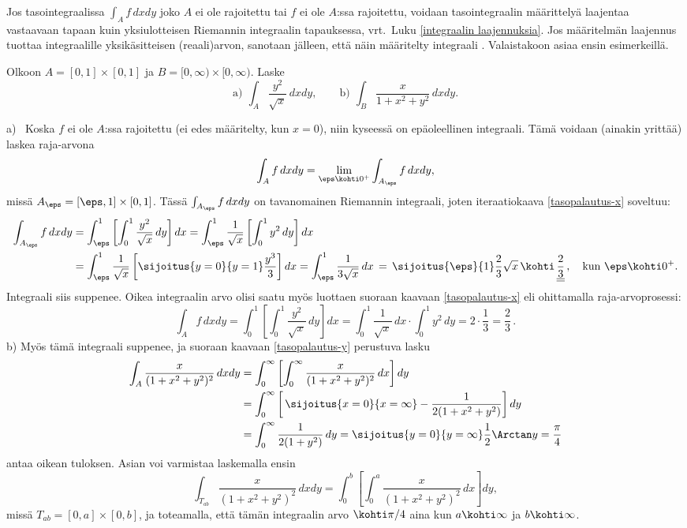 Jos tasointegraalissa $\int_A f\,dxdy$ joko $A$ ei ole rajoitettu tai $f$ ei ole $A$:ssa
rajoitettu, voidaan tasointegraalin määrittelyä laajentaa vastaavaan tapaan kuin yksiulotteisen
Riemannin integraalin tapauksessa, vrt.\ Luku \ref{integraalin laajennuksia}. Jos määritelmän
laajennus tuottaa integraalille yksikäsitteisen (reaali)arvon, sanotaan jälleen, että näin
%
määritelty  integraali . Valaistakoon asiaa ensin esimerkeillä.
\begin{Exa} Olkoon $A=[0,1]\times[0,1]$ ja $B=[0,\infty)\times[0,\infty)$. Laske
\[
\text{a)}\,\ \int_A \frac{y^2}{\sqrt{x}}\,dxdy, \qquad
\text{b)}\,\ \int_B \frac{x}{1+x^2+y^2}\,dxdy.
\]
\end{Exa}
\ratk a) \ Koska $f$ ei ole $A$:ssa rajoitettu (ei edes määritelty, kun $x=0$), niin kyseessä
on epäoleellinen integraali. Tämä voidaan (ainakin yrittää) laskea raja-arvona
\[
\int_A f\,dxdy=\lim_{\eps\kohti 0^+} \int_{A_\eps} f\,dxdy,
\]
missä $A_\eps=[\eps,1]\times [0,1]$. Tässä $\int_{A_\eps} f\,dxdy$ on tavanomainen Riemannin
integraali, joten iteraatiokaava \eqref{tasopalautus-x} soveltuu:
\begin{align*}
\int_{A_\eps} f\,dxdy 
&= \int_\eps^1 \left[ \int_0^1 \frac{y^2}{\sqrt{x}}\,dy \right]dx
 = \int_\eps^1 \frac{1}{\sqrt{x}}\left[ \int_0^1 y^2\,dy \right]dx \\
&= \int_\eps^1 \frac{1}{\sqrt{x}}\left[ \sijoitus{y=0}{y=1} \frac{y^3}{3} \right]dx
 = \int_\eps^1 \frac{1}{3\sqrt{x}}\,dx\,
 = \,\sijoitus{\eps}{1} \frac{2}{3}\sqrt{x}\,\kohti\,\underline{\underline{\frac{2}{3}}}\,,
                                              \quad \text{kun}\ \eps\kohti 0^+.
\end{align*}
Integraali siis suppenee. Oikea integraalin arvo olisi saatu myös luottaen suoraan kaavaan
\eqref{tasopalautus-x} eli ohittamalla raja-arvoprosessi:
\[
\int_A f\,dxdy = \int_0^1\left[\int_0^1 \frac{y^2}{\sqrt{x}}\,dy\right]dx 
               = \int_0^1 \frac{1}{\sqrt{x}}\,dx \cdot \int_0^1 y^2\,dy
               = 2 \cdot \frac{1}{3} = \frac{2}{3}\,.
\]
b) Myös tämä integraali suppenee, ja suoraan kaavaan \eqref{tasopalautus-y} perustuva lasku
\begin{align*}
\int_A \frac{x}{(1+x^2+y^2)^2}\,dxdy 
       &= \int_0^\infty\left[\int_0^\infty \frac{x}{(1+x^2+y^2)^2}\,dx\right]dy \\
       &= \int_0^\infty\left[\,\sijoitus{x=0}{x=\infty}-\frac{1}{2(1+x^2+y^2)}\right]dy \\
       &= \int_0^\infty \frac{1}{2(1+y^2)}\,dy
        = \sijoitus{y=0}{y=\infty}\frac{1}{2}\Arctan y = \frac{\pi}{4}
\end{align*}
antaa oikean tuloksen. Asian voi varmistaa laskemalla ensin
\[
\int_{T_{ab}} \frac{x}{(1+x^2+y^2)^2}\,dxdy 
               = \int_0^b\left[\int_0^a \frac{x}{(1+x^2+y^2)^2}\,dx\right]dy,
\]
missä $T_{ab}=[0,a]\times[0,b]$, ja toteamalla, että tämän integraalin arvo $\kohti\pi/4$ aina
kun $a\kohti\infty$ ja $b\kohti\infty$. \loppu

